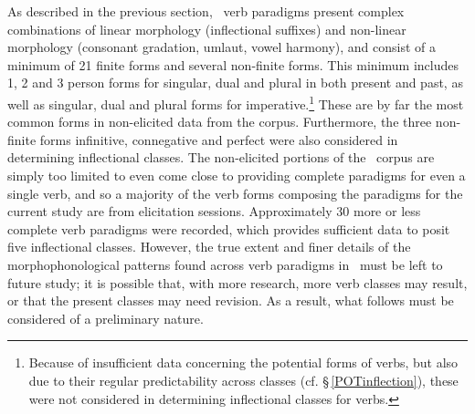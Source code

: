 As described in the previous section, \PS\ verb paradigms present complex combinations of linear morphology (inflectional suffixes) and non-linear morphology (consonant gradation, umlaut, vowel harmony), and consist of a minimum of 21 finite forms and several non-finite forms. This minimum includes 1, 2 and 3 person forms for singular, dual and plural in both present and past, as well as singular, dual and plural forms for imperative.\footnote{Because of insufficient data concerning the potential forms of verbs, but also due to their regular predictability across classes (cf. §\,\ref{POTinflection}), these were not considered in determining inflectional classes for verbs.} 
These are by far the most common forms in non-elicited data from the corpus. Furthermore, the three non-finite forms infinitive, connegative and perfect were also considered in determining inflectional classes. %
The non-elicited portions of the \PSDP\ corpus are simply too limited to even come close to providing complete paradigms for even a single verb, and so a majority of the verb forms composing the paradigms for the current study are from elicitation sessions. Approximately 30 more or less complete verb paradigms were recorded, which provides sufficient data to posit five inflectional classes. However, the true extent and finer details of the morphophonological patterns found across verb paradigms in \PS\ must be left to future study; it is possible that, with more research, more verb classes may result, or that the present classes may need revision. As a result, what follows must be considered of a preliminary nature. 


